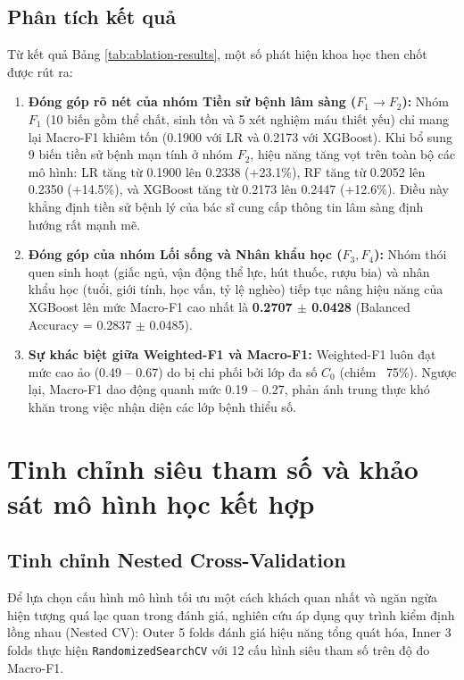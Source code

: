 \subsection{Phân tích kết quả}
Từ kết quả Bảng \ref{tab:ablation-results}, một số phát hiện khoa học then chốt được rút ra:
\begin{enumerate}
    \item \textbf{Đóng góp rõ nét của nhóm Tiền sử bệnh lâm sàng ($F_1 \to F_2$):} Nhóm $F_1$ (10 biến gồm thể chất, sinh tồn và 5 xét nghiệm máu thiết yếu) chỉ mang lại Macro-F1 khiêm tốn (0.1900 với LR và 0.2173 với XGBoost). Khi bổ sung 9 biến tiền sử bệnh mạn tính ở nhóm $F_2$, hiệu năng tăng vọt trên toàn bộ các mô hình: LR tăng từ 0.1900 lên 0.2338 (+23.1\%), RF tăng từ 0.2052 lên 0.2350 (+14.5\%), và XGBoost tăng từ 0.2173 lên 0.2447 (+12.6\%). Điều này khẳng định tiền sử bệnh lý của bác sĩ cung cấp thông tin lâm sàng định hướng rất mạnh mẽ.
    \item \textbf{Đóng góp của nhóm Lối sống và Nhân khẩu học ($F_3, F_4$):} Nhóm thói quen sinh hoạt (giấc ngủ, vận động thể lực, hút thuốc, rượu bia) và nhân khẩu học (tuổi, giới tính, học vấn, tỷ lệ nghèo) tiếp tục nâng hiệu năng của XGBoost lên mức Macro-F1 cao nhất là \textbf{0.2707 $\pm$ 0.0428} (Balanced Accuracy = 0.2837 $\pm$ 0.0485).
    \item \textbf{Sự khác biệt giữa Weighted-F1 và Macro-F1:} Weighted-F1 luôn đạt mức cao ảo (0.49 -- 0.67) do bị chi phối bởi lớp đa số $C_0$ (chiếm ~75\%). Ngược lại, Macro-F1 dao động quanh mức 0.19 -- 0.27, phản ánh trung thực khó khăn trong việc nhận diện các lớp bệnh thiểu số.
\end{enumerate}

\section{Tinh chỉnh siêu tham số và khảo sát mô hình học kết hợp}
\label{sec:tuning-va-ensemble}

\subsection{Tinh chỉnh Nested Cross-Validation}
Để lựa chọn cấu hình mô hình tối ưu một cách khách quan nhất và ngăn ngừa hiện tượng quá lạc quan trong đánh giá, nghiên cứu áp dụng quy trình kiểm định lồng nhau (Nested CV): Outer 5 folds đánh giá hiệu năng tổng quát hóa, Inner 3 folds thực hiện \texttt{RandomizedSearchCV} với 12 cấu hình siêu tham số trên độ đo Macro-F1.


